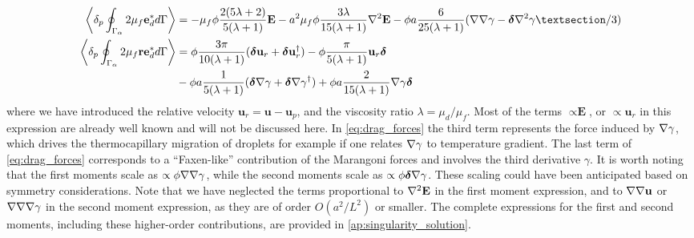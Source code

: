 \begin{align}
    \pSavg{ 2\mu_f \textbf{e}_d^*}
    &=
    -  \mu_f \phi \frac{2(5\lambda +2)}{5(\lambda+1)}\textbf{E}
    -  a^2 \mu_f \phi \frac{3\lambda}{15(\lambda+1)}\grad^2  \textbf{E}
    - \phi a  \frac{6}{25(\lambda+1)} (\grad\grad \gamma- \bm\delta\grad^2 \gamma§/3)\\
    \pSavg{ 2 \mu_f \textbf{re}_d^* }
    &=
    \phi \frac{3\pi}{10(\lambda+1)}
    (\bm\delta \textbf{u}_r +  \bm\delta\textbf{u}_r^\dagger)
    -\phi \frac{\pi}{5(\lambda+1)}\textbf{u}_r\bm\delta \\
    &-\phi a\frac{1}{5(\lambda+1)} (\bm\delta \grad \gamma+ \bm\delta\grad\gamma^\dagger)
    + \phi a\frac{2}{15(\lambda+1)}\grad\gamma\bm\delta 
    \label{eq:secondUN}
\end{align}
where we have introduced the relative velocity $\textbf{u}_r = \textbf{u} - \textbf{u}_p$, and the viscosity ratio $\lambda = \mu_d/\mu_f$. 
Most of the terms $\propto \textbf{E}$, or $\propto \textbf{u}_r$ in this expression are already well known and will not be discussed here.  
In \ref{eq:drag_forces} the third term represents the force induced by $\mathbf{\nabla} \gamma$, which drives the thermocapillary migration of droplets for example if one relates $\mathbf{\nabla}\gamma$ to temperature gradient.  
The last term of \ref{eq:drag_forces} corresponds to a ``Faxen-like'' contribution of the Marangoni forces and involves the third derivative $\gamma$.
It is worth noting that the first moments scale as $\propto \phi \mathbf{\nabla}\mathbf{\nabla} \gamma$, while the second moments scale as $\propto \phi \bm\delta \mathbf{\nabla} \gamma$.
These scaling could have been anticipated based on symmetry considerations. 
Note that we have neglected the terms proportional to $\mathbf{\nabla}^2 \textbf{E}$ in the first moment expression, and to $\mathbf{\nabla}\mathbf{\nabla} \textbf{u}$ or $\mathbf{\nabla}\mathbf{\nabla}\mathbf{\nabla} \gamma$ in the second moment expression, as they are of order $O(a^2/L^2)$ or smaller.
The complete expressions for the first and second moments, including these higher-order contributions, are provided in \ref{ap:singularity_solution}.

